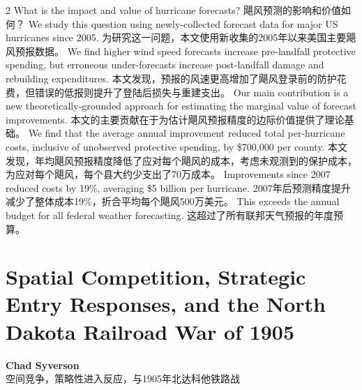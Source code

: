 \documentclass[cn,hazy,blue,14pt,screen]{elegantnote}
\begin{document}
\begin{paracol}{2}
	What is the impact and value of hurricane forecasts? 
	\switchcolumn
	飓风预测的影响和价值如何？
	\switchcolumn*
	We study this question using newly-collected forecast data for major US hurricanes since 2005. 
	\switchcolumn
	为研究这一问题，本文使用新收集的2005年以来美国主要飓风预报数据。
	\switchcolumn*
	We find higher wind speed forecasts increase pre-landfall protective spending, but erroneous under-forecasts increase post-landfall damage and rebuilding expenditures. 
	\switchcolumn
	本文发现，预报的风速更高增加了飓风登录前的防护花费，但错误的低报则提升了登陆后损失与重建支出。
	\switchcolumn*
	Our main contribution is a new theoretically-grounded approach for estimating the marginal value of forecast improvements. 
	\switchcolumn
	本文的主要贡献在于为估计飓风预报精度的边际价值提供了理论基础。
	\switchcolumn*
	We find that the average annual improvement reduced total per-hurricane costs, inclusive of unobserved protective spending, by \$700,000 per county. 
	\switchcolumn
	本文发现，年均飓风预报精度降低了应对每个飓风的成本，考虑未观测到的保护成本，为应对每个飓风，每个县大约少支出了70万成本。
	\switchcolumn*
	Improvements since 2007 reduced costs by 19\%, averaging \$5 billion per hurricane. 
	\switchcolumn
	2007年后预测精度提升减少了整体成本19\%，折合平均每个飓风500万美元。
	\switchcolumn*
	This exceeds the annual budget for all federal weather forecasting.
	\switchcolumn
	这超过了所有联邦天气预报的年度预算。
	\switchcolumn*
	
\end{paracol}

\section{Spatial Competition, Strategic Entry Responses, and the North Dakota Railroad War of 1905}
\begin{center}
	\textbf{Chad Syverson}\\
	空间竞争，策略性进入反应，与1905年北达科他铁路战
\end{center}
\end{document}
